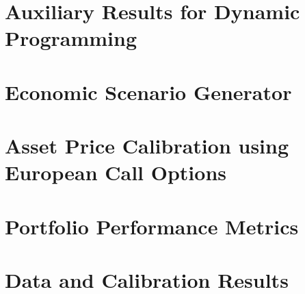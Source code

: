 \documentclass[a4paper, 12pt, openany, twoside]{book}
\makeatletter
\newcommand{\clearemptydoublepage}{%
    \clearpage
    \if@twoside
        \ifodd\c@page
        \else
            \hbox{}%
            \thispagestyle{empty}%
            \newpage
            \if@twocolumn
                \hbox{}%
                \thispagestyle{empty}%
                \newpage
            \fi
        \fi
    \fi
}
\renewcommand{\cleardoublepage}{\clearemptydoublepage}
\theoremstyle{plain}
\theoremstyle{definition}
\theoremstyle{remark}
\numberwithin{equation}{section}
\makeatother
\begin{document}
\chapter{Auxiliary Results for Dynamic Programming}

\cleardoublepage

\chapter{Economic Scenario Generator}

\cleardoublepage

\chapter{Asset Price Calibration using European Call Options}

\cleardoublepage

\chapter{Portfolio Performance Metrics}

\cleardoublepage

\chapter{Data and Calibration Results}

\cleardoublepage

\newpage
\end{document}
